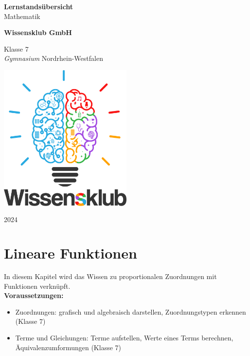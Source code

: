 \documentclass{article}
\begin{document}
\begin{titlepage}
    \begin{center}
        \vspace*{1cm}
            
        \Huge
        \textbf{Lernstandsübersicht}\\            
        \vspace{0.5cm}
        \LARGE
        Mathematik
            
        \vspace{1.5cm}
            
        \textbf{Wissensklub GmbH}
            
        \vfill
            
        Klasse 7\\
        \textit{Gymnasium} Nordrhein-Westfalen
            
        \vspace{0.8cm}
            
        \includegraphics[width=0.5\textwidth]{Wissensklub-Logo.png}
            
        \Large
        2024          
    \end{center}
\end{titlepage}

\section{Lineare Funktionen}
In diesem Kapitel wird das Wissen zu proportionalen Zuordnungen mit Funktionen verknüpft.\\
\textbf{Voraussetzungen: }
\begin{itemize}
    \item Zuordnungen: grafisch und algebraisch darstellen, Zuordnungstypen erkennen (Klasse 7)
    \item Terme und Gleichungen: Terme aufstellen, Werte eines Terms berechnen, Äquivalenzumformungen (Klasse 7)
\end{itemize}
\end{document}
